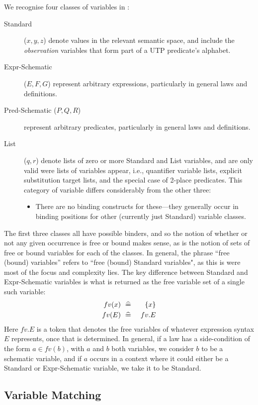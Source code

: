 We recognise four classes of variables in :
\begin{description}
  \item[Standard] ($x,y,z$)
     denote values in the relevant semantic space,
     and include the \emph{observation} variables that form part of a UTP predicate's alphabet.
  \item[Expr-Schematic] ($E,F,G$)
    represent arbitrary expressions, particularly in general laws and definitions.
  \item[Pred-Schematic ($P,Q,R$)]
    represent arbitrary predicates,  particularly in general laws and definitions.
  \item[List] ($q,r$)
    denote lists of zero or more Standard and List variables,
    and are only valid were lists of variables appear,
    i.e., quantifier variable lists, explicit substitution target lists,
    and the special case of 2-place predicates.
    This category of variable differs considerably from the other three:
    \begin{itemize}
      \item
        There are no binding constructs for these---they generally occur in binding positions
        for other (currently just Standard) variable classes.
    \end{itemize}
\end{description}
The first three classes all have possible binders, and so the notion of
whether or not any given occurrence is free or bound makes sense,
as is the notion of sets of free or bound variables for each of the classes.
In general, the phrase ``free (bound) variables'' refers to ``free (bound) Standard variables",
as this is were most of the focus and complexity lies.
The key difference between Standard and Expr-Schematic variables
is what is returned as the free variable set of a single such variable:
\begin{eqnarray*}
   fv(x) &\defs& \setof x
\\ fv(E) &\defs& fv.E
\end{eqnarray*}
Here $fv.E$ is a token that denotes
the free variables of whatever expression syntax $E$ represents,
once that is determined.
In general, if a law has a side-condition of the form $a \in fv(b)$,
with $a$ and $b$ both variables,
we consider $b$ to be a schematic variable, and if $a$ occurs in a context where
it could either be a Standard or Expr-Schematic variable, we take it to be Standard.

\newpage
\subsection{Variable Matching}

